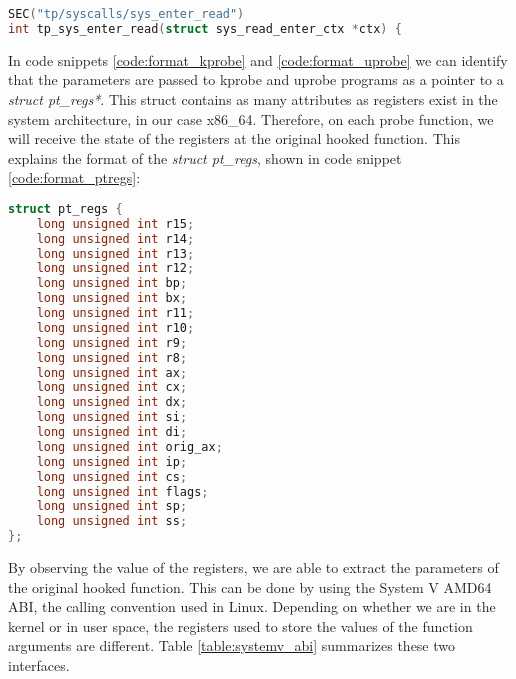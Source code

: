 \begin{lstlisting}[language=C, caption={Probe function for a tracepoint on the start of the syscall sys\_read.}, label={code:format_tracepoint}]
SEC("tp/syscalls/sys_enter_read") 
int tp_sys_enter_read(struct sys_read_enter_ctx *ctx) { 
\end{lstlisting}

In code snippets \ref{code:format_kprobe} and \ref{code:format_uprobe} we can identify that the parameters are passed to kprobe and uprobe programs as a pointer to a \textit{struct pt\_regs*}. This struct contains as many attributes as registers exist in the system architecture, in our case x86\_64. Therefore, on each probe function, we will receive the state of the registers at the original hooked function. This explains the format of the \textit{struct pt\_regs}, shown in code snippet \ref{code:format_ptregs}:

\begin{lstlisting}[language=C, caption={Format of struct pt\_regs.}, label={code:format_ptregs}]
struct pt_regs {
	long unsigned int r15;
	long unsigned int r14;
	long unsigned int r13;
	long unsigned int r12;
	long unsigned int bp;
	long unsigned int bx;
	long unsigned int r11;
	long unsigned int r10;
	long unsigned int r9;
	long unsigned int r8;
	long unsigned int ax;
	long unsigned int cx;
	long unsigned int dx;
	long unsigned int si;
	long unsigned int di;
	long unsigned int orig_ax;
	long unsigned int ip;
	long unsigned int cs;
	long unsigned int flags;
	long unsigned int sp;
	long unsigned int ss;
};
\end{lstlisting}

By observing the value of the registers, we are able to extract the parameters of the original hooked function. This can be done by using the System V AMD64 ABI\cite{8664_params_abi}, the calling convention used in Linux. Depending on whether we are in the kernel or in user space, the registers used to store the values of the function arguments are different. Table \ref{table:systemv_abi} summarizes these two interfaces. 

